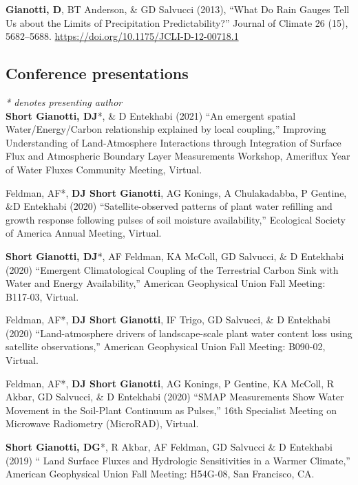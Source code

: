 \documentclass[10pt, a4paper]{article}
\renewcommand{\emph}[1]{\textit{#1}}
\newcommand{\lbr}{\vspace*{12pt}}
\newcommand{\years}[1]{\mbox{}\marginnote{\scriptsize #1}} %
\begin{document}
\years{2013a}\textbf{Gianotti, D}, BT Anderson, \& GD Salvucci (2013), ``What Do Rain Gauges Tell Us about the Limits of Precipitation Predictability?'' Journal of Climate 26 (15), 5682--5688. \url{https://doi.org/10.1175/JCLI-D-12-00718.1} \lbr

\subsection*{Conference presentations}
\emph{* denotes presenting author} \\

\noindent
\years{2021}\textbf{Short Gianotti, DJ}*, \& D Entekhabi (2021) ``An emergent spatial Water/Energy/Carbon relationship explained by local coupling,'' Improving Understanding of Land-Atmosphere Interactions through Integration of Surface Flux and Atmospheric Boundary Layer Measurements Workshop, Ameriflux Year of Water Fluxes Community Meeting, Virtual.\lbr %

\years{2020}Feldman, AF*, \textbf{DJ Short Gianotti}, AG Konings, A Chulakadabba, P Gentine, \&D Entekhabi (2020) ``Satellite-observed patterns of plant water refilling and growth response following pulses of soil moisture availability,'' Ecological Society of America Annual Meeting, Virtual.\lbr %

\years{2020}\textbf{Short Gianotti, DJ}*, AF Feldman, KA McColl, GD Salvucci, \& D Entekhabi (2020) ``Emergent Climatological Coupling of the Terrestrial Carbon Sink with Water and Energy Availability,'' American Geophysical Union Fall Meeting: B117-03, Virtual.\lbr

\years{2020}Feldman, AF*, \textbf{DJ Short Gianotti}, IF Trigo, GD Salvucci, \& D Entekhabi (2020) ``Land-atmosphere drivers of landscape-scale plant water content loss using satellite observations,'' American Geophysical Union Fall Meeting: B090-02, Virtual.\lbr

\years{2020}Feldman, AF*, \textbf{DJ Short Gianotti}, AG Konings, P Gentine, KA McColl, R Akbar, GD Salvucci, \& D Entekhabi (2020) ``SMAP Measurements Show Water Movement in the Soil-Plant Continuum as Pulses,'' 16th Specialist Meeting on Microwave Radiometry (MicroRAD), Virtual.\lbr %


\years{2019}\textbf{Short Gianotti, DG}*, R Akbar, AF Feldman, GD Salvucci \& D Entekhabi (2019) `` Land Surface Fluxes and Hydrologic Sensitivities in a Warmer Climate,'' American Geophysical Union Fall Meeting: H54G-08, San Francisco, CA.\lbr %
\end{document}
